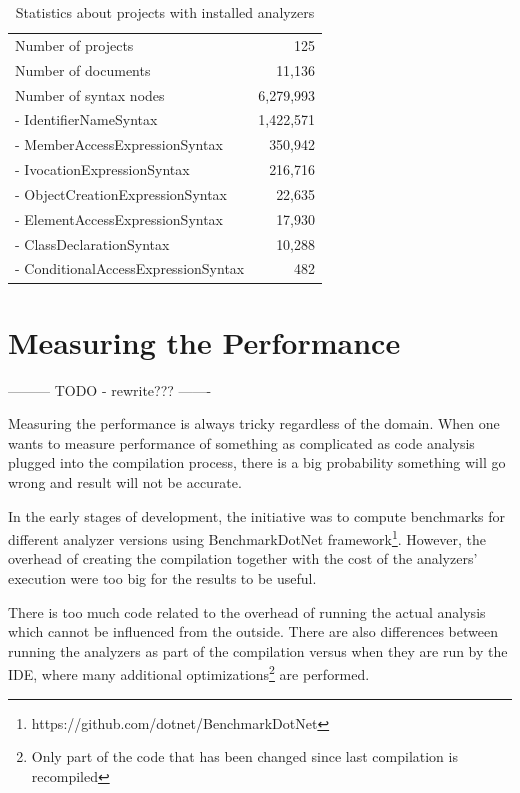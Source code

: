 \documentclass[
  digital, %
  table,   %
  lof,     %
  lot,     %
  oneside,
]{fithesis3}
\begin{document}
\begin{table}
\begin{tabularx}{\textwidth}{Xr}
\toprule
Number of projects                  & 125 \\
Number of documents              & 11,136 \\
Number of syntax nodes        & 6,279,993 \\
\midrule
- IdentifierNameSyntax        & 1,422,571 \\
- MemberAccessExpressionSyntax  & 350,942 \\
- IvocationExpressionSyntax     & 216,716 \\
- ObjectCreationExpressionSyntax & 22,635 \\ 
- ElementAccessExpressionSyntax  & 17,930 \\
- ClassDeclarationSyntax         & 10,288 \\ 
- ConditionalAccessExpressionSyntax & 482 \\

\bottomrule

\end{tabularx}
\caption{Statistics about projects with installed analyzers}
\label{tab:solution-statistics}
\end{table}

\section{Measuring the Performance}
--------- TODO - rewrite??? -------

Measuring the performance is always tricky regardless of the domain. When one wants to measure performance of something as complicated as code analysis plugged into the compilation process, there is a big probability something will go wrong and result will not be accurate.

In the early stages of development, the initiative was to compute benchmarks for different analyzer versions using BenchmarkDotNet framework\footnote{https://github.com/dotnet/BenchmarkDotNet}. However, the overhead of creating the compilation together with the cost of the analyzers' execution were too big for the results to be useful. 

There is too much code related to the overhead of running the actual analysis which cannot be influenced from the outside. There are also differences between running the analyzers as part of the compilation versus when they are run by the IDE, where many additional optimizations\footnote{Only part of the code that has been changed since last compilation is recompiled} are performed. 
\end{document}
